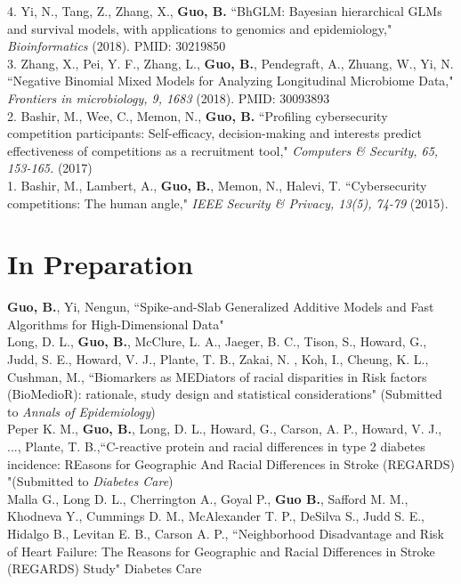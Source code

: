 4.  Yi, N., Tang, Z., Zhang, X., \textbf{Guo, B.}  ``BhGLM: Bayesian hierarchical GLMs and survival models, with applications to genomics and epidemiology," \textit{Bioinformatics} (2018). PMID: 30219850\\

3. Zhang, X., Pei, Y. F., Zhang, L., \textbf{Guo, B.}, Pendegraft, A., Zhuang, W., Yi, N. ``Negative Binomial Mixed Models for Analyzing Longitudinal Microbiome Data," \textit{Frontiers in microbiology, 9, 1683} (2018). PMID: 30093893\\

2. Bashir, M., Wee, C., Memon, N., \textbf{Guo, B.} ``Profiling cybersecurity competition participants: Self-efficacy, decision-making and interests predict effectiveness of competitions as a recruitment tool," \textit{Computers \& Security, 65, 153-165.} (2017)\\

1. Bashir, M., Lambert, A., \textbf{Guo, B.}, Memon, N., Halevi, T. ``Cybersecurity competitions: The human angle," \textit{IEEE Security \& Privacy, 13(5), 74-79} (2015).\\

\section{In Preparation}

\vspace{-3ex}

\textbf{Guo, B.}, Yi, Nengun, ``Spike-and-Slab Generalized Additive Models and Fast Algorithms for High-Dimensional Data"\\

Long, D. L., \textbf{Guo, B.}, McClure, L. A., Jaeger, B. C., Tison, S., Howard, G., Judd, S. E., Howard, V. J., Plante, T. B., Zakai, N. , Koh, I., Cheung, K. L., Cushman, M., ``Biomarkers as MEDiators of racial disparities in Risk factors (BioMedioR): rationale, study design and statistical considerations" (Submitted to \textit{Annals of Epidemiology})\\

Peper K. M., \textbf{Guo, B.}, Long, D. L., Howard, G., Carson, A. P., Howard, V. J., ..., Plante, T. B.,``C-reactive protein and racial differences in type 2 diabetes incidence: REasons for Geographic And Racial Differences in Stroke (REGARDS) "(Submitted to \textit{Diabetes Care})\\

Malla G., Long D. L., Cherrington A., Goyal P., \textbf{Guo B.}, Safford M. M., Khodneva Y., Cummings D. M., McAlexander T. P., DeSilva S., Judd S. E., Hidalgo B., Levitan E. B., Carson A. P., ``Neighborhood Disadvantage and Risk of Heart Failure: The Reasons for Geographic and Racial Differences in Stroke (REGARDS) Study" Diabetes Care\\

